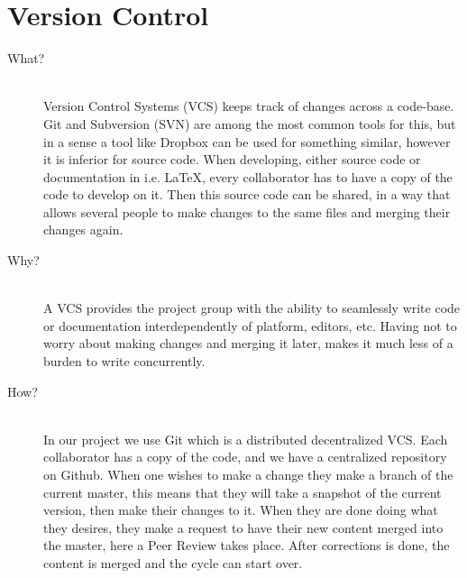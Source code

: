 \section*{Version Control}
\label{sec:versioncontrol}
\begin{description}
    \item[What?]\hfill\\
    Version Control Systems (VCS) keeps track of changes across a code-base. 
    Git and Subversion (SVN) are among the most common tools for this, but in a sense a tool like Dropbox can be used for something similar, however it is inferior for source code.
    When developing, either source code or documentation in i.e. LaTeX, every collaborator has to have a copy of the code to develop on it. 
    Then this source code can be shared, in a way that allows several people to make changes to the same files and merging their changes again. 

    \item[Why?]\hfill\\ 
    A VCS provides the project group with the ability to seamlessly write code or documentation interdependently of platform, editors, etc.
    Having not to worry about making changes and merging it later, makes it much less of a burden to write concurrently. 

    \item[How?]\hfill\\
    In our project we use Git which is a distributed decentralized VCS. 
    Each collaborator has a copy of the code, and we have a centralized repository on Github. 
    When one wishes to make a change they make a branch of the current master, this means that they will take a snapshot of the current version, then make their changes to it.
    When they are done doing what they desires, they make a request to have their new content merged into the master, here a Peer Review takes place. 
    After corrections is done, the content is merged and the cycle can start over. 
\end{description}

